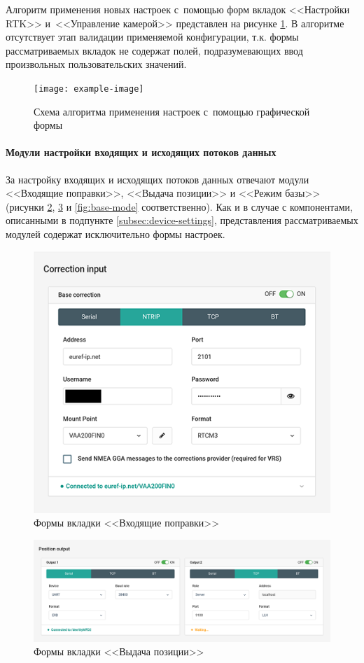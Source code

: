 Алгоритм применения новых настроек с~помощью форм вкладок <<Настройки RTK>> и~<<Управление камерой>> представлен на рисунке \ref{fig:basic-form-apply}. В алгоритме отсутствует этап валидации применяемой конфигурации, т.к. формы рассматриваемых вкладок не содержат полей, подразумевающих ввод произвольных пользовательских значений.

\begin{figure}[h!]
  \centering
  \setlength{\fboxsep}{5pt}
  \texttt{[image: example-image]}
  \vspace*{6pt}
  \caption{Схема алгоритма применения настроек с~помощью графической формы}
  \label{fig:basic-form-apply}
\end{figure}

\paragraph{Модули настройки входящих и исходящих потоков данных}

За настройку входящих и исходящих потоков данных отвечают модули <<Входящие поправки>>, <<Выдача позиции>> и <<Режим базы>> (рисунки \ref{fig:correction-input}, \ref{fig:position-output} и \ref{fig:base-mode} соответственно). Как и в случае с компонентами, описанными в подпункте \ref{subsec:device-settings}, представления рассматриваемых модулей содержат исключительно формы настроек.

\begin{figure}[h!]
  \centering
  \setlength{\fboxsep}{5pt}
  \includegraphics[width=.5\textwidth]{img/reachview/correction-input_content_laptop}
  \vspace*{6pt}
  \caption{Формы вкладки <<Входящие поправки>>}
  \label{fig:correction-input}
\end{figure}

\begin{figure}[h!]
  \centering
  \setlength{\fboxsep}{5pt}
  \includegraphics[width=.8\textwidth]{img/reachview/position-output_content_laptop}
  \vspace*{6pt}
  \caption{Формы вкладки <<Выдача позиции>>}
  \label{fig:position-output}
\end{figure}

